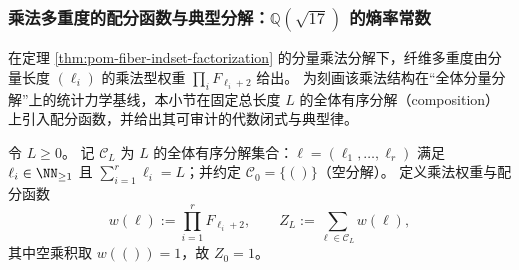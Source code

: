 \subsubsection{乘法多重度的配分函数与典型分解：\texorpdfstring{$\mathbb{Q}(\sqrt{17})$}{Q(sqrt(17))} 的熵率常数}\label{subsec:pom-multiplicity-composition-partition-sqrt17}
在定理 \ref{thm:pom-fiber-indset-factorization} 的分量乘法分解下，纤维多重度由分量长度 \((\ell_i)\) 的乘法型权重
\(
\prod_i F_{\ell_i+2}
\)
给出。
为刻画该乘法结构在“全体分量分解”上的统计力学基线，本小节在固定总长度 \(L\) 的全体有序分解（composition）上引入配分函数，并给出其可审计的代数闭式与典型律。

\begin{definition}\label{def:pom-multiplicity-composition-partition}
令 \(L\ge 0\)。
记 \(\mathcal{C}_L\) 为 \(L\) 的全体有序分解集合：\(\boldsymbol{\ell}=(\ell_1,\dots,\ell_r)\) 满足
\(\ell_i\in\NN_{\ge 1}\) 且 \(\sum_{i=1}^r \ell_i=L\)；并约定 \(\mathcal{C}_0=\{()\}\)（空分解）。
定义乘法权重与配分函数
\[
w(\boldsymbol{\ell})
:=\prod_{i=1}^r F_{\ell_i+2},
\qquad
Z_L:=\sum_{\boldsymbol{\ell}\in\mathcal{C}_L} w(\boldsymbol{\ell}),
\]
其中空乘积取 \(w(())=1\)，故 \(Z_0=1\)。
\end{definition}

